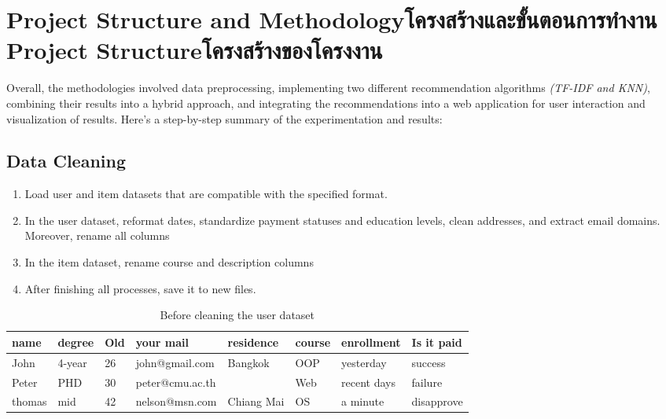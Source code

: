\chapter{\ifproject%
\ifenglish Project Structure and Methodology\else โครงสร้างและขั้นตอนการทำงาน\fi
\else%
\ifenglish Project Structure\else โครงสร้างของโครงงาน\fi
\fi
}

Overall, the methodologies involved data preprocessing, implementing 
two different recommendation algorithms \textit{(TF-IDF and KNN)}, 
combining their results into a hybrid approach, and integrating 
the recommendations into a web application for user interaction 
and visualization of results. Here's a step-by-step summary of 
the experimentation and results:

\makeatletter

\section{Data Cleaning}
\begin{enumerate}
    \item \textsf{Load user and item datasets that are compatible with the specified format.}
    \item \textsf{In the user dataset, reformat dates, standardize payment statuses and education 
    levels, clean addresses, and extract email domains. Moreover, rename all columns}
    \item \textsf{In the item dataset, rename course and description columns}
    \item \textsf{After finishing all processes, save it to new files.}
\end{enumerate}

\begin{table}[htbp]
\center
\small
\begin{tabular}{p{1.1cm}p{1cm}p{0.5cm}p{2.5cm}p{1.75cm}p{1cm}p{1.75cm}p{1.7cm}} %
    \toprule
    \textbf{name} & \textbf{degree} & \textbf{Old}   & \textbf{your mail} & \textbf{residence}  & \textbf{course} & \textbf{enrollment} & \textbf{Is it paid} \\
    \midrule
    John       & 4-year     & 26           & john@gmail.com    & Bangkok & OOP  & yesterday     & success  \\
    Peter         & PHD        & 30     & peter@cmu.ac.th  &  &  Web & recent days    & failure \\
    thomas      & mid        & 42    & nelson@msn.com  & Chiang Mai & OS& a minute    & disapprove  \\
    \bottomrule
\end{tabular}
\caption{Before cleaning the user dataset}
\end{table}

